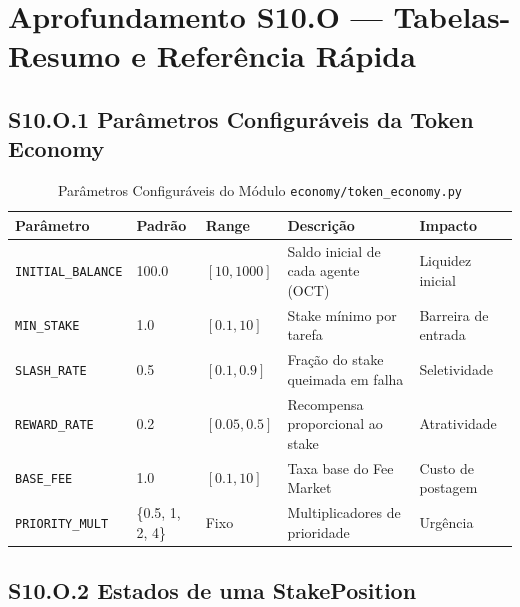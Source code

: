 
\section*{Aprofundamento S10.O --- Tabelas-Resumo e Referência Rápida}

\subsection*{S10.O.1 Parâmetros Configuráveis da Token Economy}

\begin{table}[htbp]
\centering
\caption{Parâmetros Configuráveis do Módulo \texttt{economy/token\_economy.py}}
\label{tab:parameters}
\begin{tabular}{p{2.5cm}p{1.5cm}p{1.5cm}p{5cm}p{4cm}}
\hline
\textbf{Parâmetro} & \textbf{Padrão} & \textbf{Range} & \textbf{Descrição} & \textbf{Impacto} \\
\hline
\texttt{INITIAL\_BALANCE} & 100.0 & $[10, 1000]$ & Saldo inicial de cada agente (OCT) & Liquidez inicial \\
\hline
\texttt{MIN\_STAKE} & 1.0 & $[0.1, 10]$ & Stake mínimo por tarefa & Barreira de entrada \\
\hline
\texttt{SLASH\_RATE} & 0.5 & $[0.1, 0.9]$ & Fração do stake queimada em falha & Seletividade \\
\hline
\texttt{REWARD\_RATE} & 0.2 & $[0.05, 0.5]$ & Recompensa proporcional ao stake & Atratividade \\
\hline
\texttt{BASE\_FEE} & 1.0 & $[0.1, 10]$ & Taxa base do Fee Market & Custo de postagem \\
\hline
\texttt{PRIORITY\_MULT} & \{0.5, 1, 2, 4\} & Fixo & Multiplicadores de prioridade & Urgência \\
\hline
\end{tabular}
\end{table}

\subsection*{S10.O.2 Estados de uma StakePosition}

